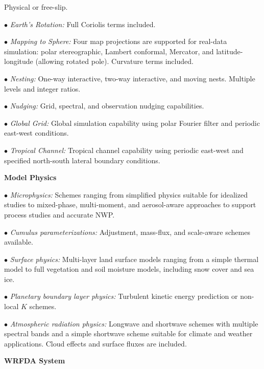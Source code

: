 \begin{description}
Physical or free-slip.
%
\item{$\bullet$} {\em Earth's Rotation:}
Full Coriolis terms included.
%
\item{$\bullet$} {\em Mapping to Sphere:} 
Four map projections are supported for real-data simulation: 
polar stereographic, Lambert conformal, Mercator, and 
latitude-longitude (allowing rotated pole). 
Curvature terms included.
%
\item{$\bullet$} {\em Nesting:} 
One-way interactive, two-way interactive, and moving nests.
Multiple levels and integer ratios.
%
\item{$\bullet$} {\em Nudging:}
Grid, spectral, and observation nudging capabilities. 
%
\item{$\bullet$} {\em Global Grid:}
Global simulation capability using polar Fourier filter and 
periodic east-west conditions. 
%
\item{$\bullet$} {\em Tropical Channel:}
Tropical channel capability using periodic east-west and specified north-south 
lateral boundary conditions.
\end{description}

\vskip 12pt
{\noindent\bf Model Physics}
\vskip 12pt

\begin{description}
\setlength{\itemsep}{-5pt}
\item{$\bullet$} {\em Microphysics:} Schemes ranging from simplified
physics suitable for idealized studies to mixed-phase, multi-moment, and aerosol-aware
approaches to support process studies and accurate NWP.
%
\item{$\bullet$} {\em Cumulus parameterizations:}
Adjustment, mass-flux, and scale-aware schemes available.
%
\item{$\bullet$} {\em Surface physics:}
Multi-layer land surface models ranging from a simple thermal model to full
vegetation and soil moisture models, including snow cover and sea ice.
%
\item{$\bullet$} {\em Planetary boundary layer physics:}
Turbulent kinetic energy prediction or non-local $K$ schemes.
%
\item{$\bullet$} {\em Atmospheric radiation physics:} 
Longwave and shortwave schemes with multiple spectral bands and a 
simple shortwave scheme suitable for climate and weather applications.  
Cloud effects and surface fluxes are included.
\end{description}

\vskip 12pt
{\noindent\bf WRFDA System}
\vskip 12pt


